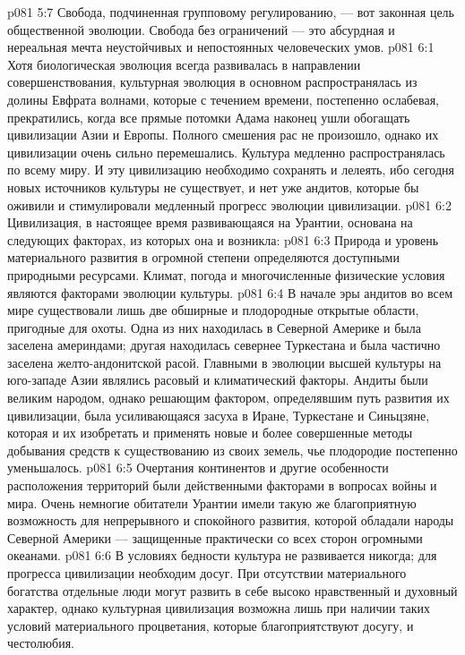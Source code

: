 \vs p081 5:7 Свобода, подчиненная групповому регулированию, --- вот законная цель общественной эволюции. Свобода без ограничений --- это абсурдная и нереальная мечта неустойчивых и непостоянных человеческих умов.
\vs p081 6:1 Хотя биологическая эволюция всегда развивалась в направлении совершенствования, культурная эволюция в основном распространялась из долины Евфрата волнами, которые с течением времени, постепенно ослабевая, прекратились, когда все прямые потомки Адама наконец ушли обогащать цивилизации Азии и Европы. Полного смешения рас не произошло, однако их цивилизации очень сильно перемешались. Культура медленно распространялась по всему миру. И эту цивилизацию необходимо сохранять и лелеять, ибо сегодня новых источников культуры не существует, и нет уже андитов, которые бы оживили и стимулировали медленный прогресс эволюции цивилизации.
\vs p081 6:2 \pc Цивилизация, в настоящее время развивающаяся на Урантии, основана на следующих факторах, из которых она и возникла:
\vs p081 6:3 \bibnobreakspace {} Природа и уровень материального развития в огромной степени определяются доступными природными ресурсами. Климат, погода и многочисленные физические условия являются факторами эволюции культуры.
\vs p081 6:4 В начале эры андитов во всем мире существовали лишь две обширные и плодородные открытые области, пригодные для охоты. Одна из них находилась в Северной Америке и была заселена америндами; другая находилась севернее Туркестана и была частично заселена желто\hyp{}андонитской расой. Главными в эволюции высшей культуры на юго\hyp{}западе Азии являлись расовый и климатический факторы. Андиты были великим народом, однако решающим фактором, определявшим путь развития их цивилизации, была усиливающаяся засуха в Иране, Туркестане и Синьцзяне, которая и  их изобретать и применять новые и более совершенные методы добывания средств к существованию из своих земель, чье плодородие постепенно уменьшалось.
\vs p081 6:5 Очертания континентов и другие особенности расположения территорий были действенными факторами в вопросах войны и мира. Очень немногие обитатели Урантии имели такую же благоприятную возможность для непрерывного и спокойного развития, которой обладали народы Северной Америки --- защищенные практически со всех сторон огромными океанами.
\vs p081 6:6 \pc {}\bibnobreakspace {} В условиях бедности культура не развивается никогда; для прогресса цивилизации необходим досуг. При отсутствии материального богатства отдельные люди могут развить в себе высоко нравственный и духовный характер, однако культурная цивилизация возможна лишь при наличии таких условий материального процветания, которые благоприятствуют досугу, и честолюбия.
